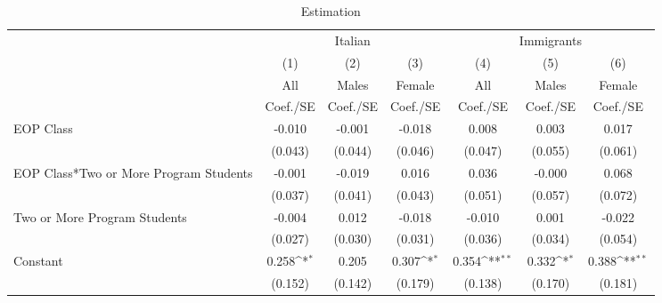 \begin{table}[htbp]\centering
\def\sym#1{\ifmmode^{#1}\else\(^{#1}\)\fi}
\caption{Estimation \label{peer\_recc\_lictec2}}
\begin{tabular}{l*{6}{c}}
\toprule
                    &\multicolumn{3}{c}{Italian}                                      &\multicolumn{3}{c}{Immigrants}                                   \\\cmidrule(lr){2-4}\cmidrule(lr){5-7}
                    &\multicolumn{1}{c}{(1)}&\multicolumn{1}{c}{(2)}&\multicolumn{1}{c}{(3)}&\multicolumn{1}{c}{(4)}&\multicolumn{1}{c}{(5)}&\multicolumn{1}{c}{(6)}\\
                    &\multicolumn{1}{c}{All}&\multicolumn{1}{c}{Males}&\multicolumn{1}{c}{Female}&\multicolumn{1}{c}{All}&\multicolumn{1}{c}{Males}&\multicolumn{1}{c}{Female}\\
                    &    Coef./SE         &    Coef./SE         &    Coef./SE         &    Coef./SE         &    Coef./SE         &    Coef./SE         \\
\midrule
EOP Class           &      -0.010         &      -0.001         &      -0.018         &       0.008         &       0.003         &       0.017         \\
                    &     (0.043)         &     (0.044)         &     (0.046)         &     (0.047)         &     (0.055)         &     (0.061)         \\
EOP Class*Two or More Program Students&      -0.001         &      -0.019         &       0.016         &       0.036         &      -0.000         &       0.068         \\
                    &     (0.037)         &     (0.041)         &     (0.043)         &     (0.051)         &     (0.057)         &     (0.072)         \\
Two or More Program Students&      -0.004         &       0.012         &      -0.018         &      -0.010         &       0.001         &      -0.022         \\
                    &     (0.027)         &     (0.030)         &     (0.031)         &     (0.036)         &     (0.034)         &     (0.054)         \\
Constant            &       0.258\sym{*}  &       0.205         &       0.307\sym{*}  &       0.354\sym{**} &       0.332\sym{*}  &       0.388\sym{**} \\
                    &     (0.152)         &     (0.142)         &     (0.179)         &     (0.138)         &     (0.170)         &     (0.181)         \\

\end{tabular}
\end{table}
